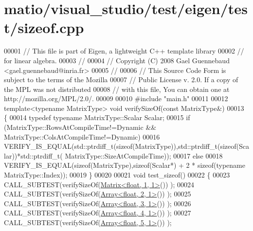 \hypertarget{matio_2visual__studio_2test_2eigen_2test_2sizeof_8cpp_source}{}\section{matio/visual\+\_\+studio/test/eigen/test/sizeof.cpp}
\label{matio_2visual__studio_2test_2eigen_2test_2sizeof_8cpp_source}

\begin{DoxyCode}
00001 \textcolor{comment}{// This file is part of Eigen, a lightweight C++ template library}
00002 \textcolor{comment}{// for linear algebra.}
00003 \textcolor{comment}{//}
00004 \textcolor{comment}{// Copyright (C) 2008 Gael Guennebaud <gael.guennebaud@inria.fr>}
00005 \textcolor{comment}{//}
00006 \textcolor{comment}{// This Source Code Form is subject to the terms of the Mozilla}
00007 \textcolor{comment}{// Public License v. 2.0. If a copy of the MPL was not distributed}
00008 \textcolor{comment}{// with this file, You can obtain one at http://mozilla.org/MPL/2.0/.}
00009 
00010 \textcolor{preprocessor}{#include "main.h"}
00011 
00012 \textcolor{keyword}{template}<\textcolor{keyword}{typename} MatrixType> \textcolor{keywordtype}{void} verifySizeOf(\textcolor{keyword}{const} MatrixType&)
00013 \{
00014   \textcolor{keyword}{typedef} \textcolor{keyword}{typename} MatrixType::Scalar Scalar;
00015   \textcolor{keywordflow}{if} (MatrixType::RowsAtCompileTime!=Dynamic && MatrixType::ColsAtCompileTime!=Dynamic)
00016     VERIFY\_IS\_EQUAL(std::ptrdiff\_t(\textcolor{keyword}{sizeof}(MatrixType)),std::ptrdiff\_t(\textcolor{keyword}{sizeof}(Scalar))*std::ptrdiff\_t(
      MatrixType::SizeAtCompileTime));
00017   \textcolor{keywordflow}{else}
00018     VERIFY\_IS\_EQUAL(\textcolor{keyword}{sizeof}(MatrixType),\textcolor{keyword}{sizeof}(Scalar*) + 2 * \textcolor{keyword}{sizeof}(\textcolor{keyword}{typename} MatrixType::Index));
00019 \}
00020 
00021 \textcolor{keywordtype}{void} test\_sizeof()
00022 \{
00023   CALL\_SUBTEST(verifySizeOf(\hyperlink{group___core___module_class_eigen_1_1_matrix}{Matrix<float, 1, 1>}()) );
00024   CALL\_SUBTEST(verifySizeOf(\hyperlink{group___core___module_class_eigen_1_1_array}{Array<float, 2, 1>}()) );
00025   CALL\_SUBTEST(verifySizeOf(\hyperlink{group___core___module_class_eigen_1_1_array}{Array<float, 3, 1>}()) );
00026   CALL\_SUBTEST(verifySizeOf(\hyperlink{group___core___module_class_eigen_1_1_array}{Array<float, 4, 1>}()) );
00027   CALL\_SUBTEST(verifySizeOf(\hyperlink{group___core___module_class_eigen_1_1_array}{Array<float, 5, 1>}()) );

\end{DoxyCode}
